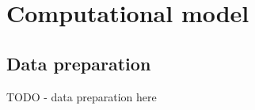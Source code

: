 \section{Computational model}

        \subsection{Data preparation}
        
                TODO - data preparation here